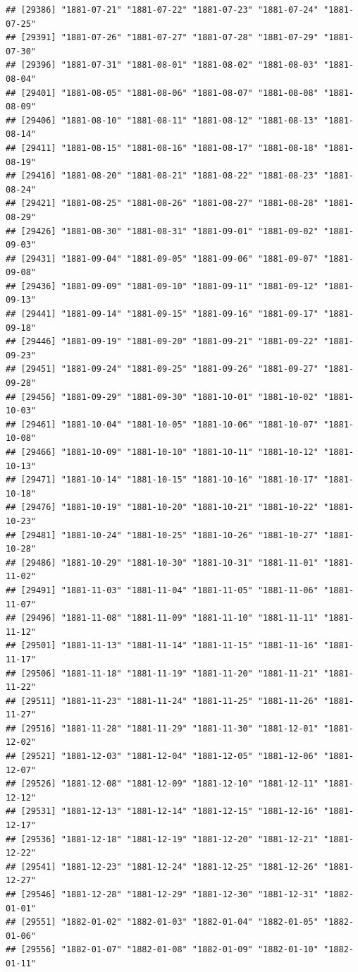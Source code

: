 \documentclass{article}\usepackage[]{graphicx}\usepackage[]{color}
\makeatletter
\newenvironment{kframe}{%
 \def\at@end@of@kframe{}%
 \ifinner\ifhmode%
  \def\at@end@of@kframe{\end{minipage}}%
  \begin{minipage}{\columnwidth}%
 \fi\fi%
 \def\FrameCommand##1{\hskip\@totalleftmargin \hskip-\fboxsep
 \colorbox{shadecolor}{##1}\hskip-\fboxsep
     \hskip-\linewidth \hskip-\@totalleftmargin \hskip\columnwidth}%
 \MakeFramed {\advance\hsize-\width
   \@totalleftmargin\z@ \linewidth\hsize
   \@setminipage}}%
 {\par\unskip\endMakeFramed%
 \at@end@of@kframe}
\newenvironment{knitrout}{}{} %
\makeatother
\begin{document}
\begin{description}
\begin{knitrout}
\begin{kframe}
\begin{verbatim}
## [29386] "1881-07-21" "1881-07-22" "1881-07-23" "1881-07-24" "1881-07-25"
## [29391] "1881-07-26" "1881-07-27" "1881-07-28" "1881-07-29" "1881-07-30"
## [29396] "1881-07-31" "1881-08-01" "1881-08-02" "1881-08-03" "1881-08-04"
## [29401] "1881-08-05" "1881-08-06" "1881-08-07" "1881-08-08" "1881-08-09"
## [29406] "1881-08-10" "1881-08-11" "1881-08-12" "1881-08-13" "1881-08-14"
## [29411] "1881-08-15" "1881-08-16" "1881-08-17" "1881-08-18" "1881-08-19"
## [29416] "1881-08-20" "1881-08-21" "1881-08-22" "1881-08-23" "1881-08-24"
## [29421] "1881-08-25" "1881-08-26" "1881-08-27" "1881-08-28" "1881-08-29"
## [29426] "1881-08-30" "1881-08-31" "1881-09-01" "1881-09-02" "1881-09-03"
## [29431] "1881-09-04" "1881-09-05" "1881-09-06" "1881-09-07" "1881-09-08"
## [29436] "1881-09-09" "1881-09-10" "1881-09-11" "1881-09-12" "1881-09-13"
## [29441] "1881-09-14" "1881-09-15" "1881-09-16" "1881-09-17" "1881-09-18"
## [29446] "1881-09-19" "1881-09-20" "1881-09-21" "1881-09-22" "1881-09-23"
## [29451] "1881-09-24" "1881-09-25" "1881-09-26" "1881-09-27" "1881-09-28"
## [29456] "1881-09-29" "1881-09-30" "1881-10-01" "1881-10-02" "1881-10-03"
## [29461] "1881-10-04" "1881-10-05" "1881-10-06" "1881-10-07" "1881-10-08"
## [29466] "1881-10-09" "1881-10-10" "1881-10-11" "1881-10-12" "1881-10-13"
## [29471] "1881-10-14" "1881-10-15" "1881-10-16" "1881-10-17" "1881-10-18"
## [29476] "1881-10-19" "1881-10-20" "1881-10-21" "1881-10-22" "1881-10-23"
## [29481] "1881-10-24" "1881-10-25" "1881-10-26" "1881-10-27" "1881-10-28"
## [29486] "1881-10-29" "1881-10-30" "1881-10-31" "1881-11-01" "1881-11-02"
## [29491] "1881-11-03" "1881-11-04" "1881-11-05" "1881-11-06" "1881-11-07"
## [29496] "1881-11-08" "1881-11-09" "1881-11-10" "1881-11-11" "1881-11-12"
## [29501] "1881-11-13" "1881-11-14" "1881-11-15" "1881-11-16" "1881-11-17"
## [29506] "1881-11-18" "1881-11-19" "1881-11-20" "1881-11-21" "1881-11-22"
## [29511] "1881-11-23" "1881-11-24" "1881-11-25" "1881-11-26" "1881-11-27"
## [29516] "1881-11-28" "1881-11-29" "1881-11-30" "1881-12-01" "1881-12-02"
## [29521] "1881-12-03" "1881-12-04" "1881-12-05" "1881-12-06" "1881-12-07"
## [29526] "1881-12-08" "1881-12-09" "1881-12-10" "1881-12-11" "1881-12-12"
## [29531] "1881-12-13" "1881-12-14" "1881-12-15" "1881-12-16" "1881-12-17"
## [29536] "1881-12-18" "1881-12-19" "1881-12-20" "1881-12-21" "1881-12-22"
## [29541] "1881-12-23" "1881-12-24" "1881-12-25" "1881-12-26" "1881-12-27"
## [29546] "1881-12-28" "1881-12-29" "1881-12-30" "1881-12-31" "1882-01-01"
## [29551] "1882-01-02" "1882-01-03" "1882-01-04" "1882-01-05" "1882-01-06"
## [29556] "1882-01-07" "1882-01-08" "1882-01-09" "1882-01-10" "1882-01-11"

\end{verbatim}
\end{kframe}
\end{knitrout}
\end{description}
\end{document}
